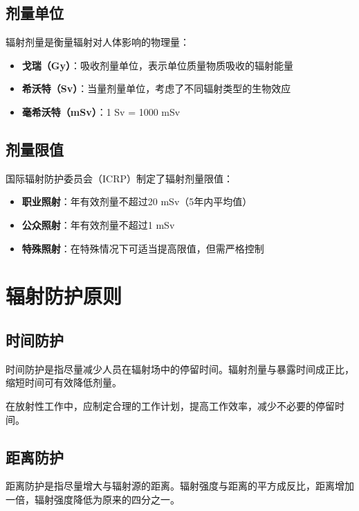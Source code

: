\documentclass[12pt,UTF8]{ctexbook}
\begin{document}
\section{剂量单位}

辐射剂量是衡量辐射对人体影响的物理量：

\begin{itemize}[leftmargin=2cm]
    \item \textbf{戈瑞（Gy）}：吸收剂量单位，表示单位质量物质吸收的辐射能量
    \item \textbf{希沃特（Sv）}：当量剂量单位，考虑了不同辐射类型的生物效应
    \item \textbf{毫希沃特（mSv）}：1 Sv = 1000 mSv
\end{itemize}

\section{剂量限值}

国际辐射防护委员会（ICRP）制定了辐射剂量限值：

\begin{itemize}[leftmargin=2cm]
    \item \textbf{职业照射}：年有效剂量不超过20 mSv（5年内平均值）
    \item \textbf{公众照射}：年有效剂量不超过1 mSv
    \item \textbf{特殊照射}：在特殊情况下可适当提高限值，但需严格控制
\end{itemize}

\chapter{辐射防护原则}

\section{时间防护}

时间防护是指尽量减少人员在辐射场中的停留时间。辐射剂量与暴露时间成正比，缩短时间可有效降低剂量。

在放射性工作中，应制定合理的工作计划，提高工作效率，减少不必要的停留时间。

\section{距离防护}

距离防护是指尽量增大与辐射源的距离。辐射强度与距离的平方成反比，距离增加一倍，辐射强度降低为原来的四分之一。
\end{document}

